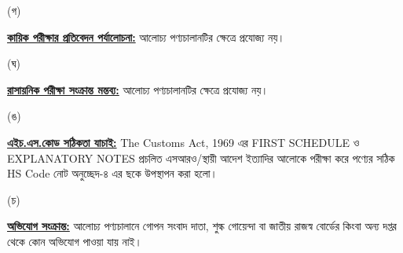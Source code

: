 \documentclass[12pt]{article}
\begin{document}
\begin{minipage}[t]{0.05\linewidth}
\hspace{1em}
\end{minipage}
\begin{minipage}[t]{0.05\linewidth}
(গ)
\end{minipage}
\begin{minipage}[t]{0.90\linewidth}
\underline{\textbf{কায়িক পরীক্ষার প্রতিবেদন পর্যালোচনা:}}
আলোচ্য পণ্যচালানটির ক্ষেত্রে প্রযোজ্য নয়।
\\
\end{minipage}
\begin{minipage}[t]{0.05\linewidth}
\hspace{1em}
\end{minipage}
\begin{minipage}[t]{0.05\linewidth}
(ঘ)
\end{minipage}
\begin{minipage}[t]{0.90\linewidth}
\underline{\textbf{রাসায়নিক পরীক্ষা সংক্রান্ত মন্তব্য:}}
আলোচ্য পণ্যচালানটির ক্ষেত্রে প্রযোজ্য নয়।
\\
\end{minipage}
\begin{minipage}[t]{0.05\linewidth}
\hspace{1em}
\end{minipage}
\begin{minipage}[t]{0.05\linewidth}
(ঙ)
\end{minipage}
\begin{minipage}[t]{0.90\linewidth}
\underline{\textbf{এইচ.এস.কোড সঠিকতা যাচাই:}}
The Customs Act, 1969 এর FIRST SCHEDULE ও
EXPLANATORY NOTES প্রচলিত এসআরও/স্থায়ী আদেশ ইত্যাদির আলোকে পরীক্ষা করে পণ্যের সঠিক HS Code নোট অনুচ্ছেদ-৪
এর ছকে উপস্থাপন করা হলো।
\\
\end{minipage}
\begin{minipage}[t]{0.05\linewidth}
\hspace{1em}
\end{minipage}
\begin{minipage}[t]{0.05\linewidth}
(চ)
\end{minipage}
\begin{minipage}[t]{0.90\linewidth}
\underline{\textbf{অভিযোগ সংক্রান্ত:}} আলোচ্য পণ্যচালানে
গোপন সংবাদ দাতা, শুল্ক গোয়েন্দা বা
জাতীয় রাজস্ব বোর্ডের কিংবা অন্য দপ্তর থেকে
কোন অভিযোগ পাওয়া যায় নাই।
\\
\end{minipage}
\begin{minipage}[t]{0.05\linewidth}
\hspace{1em}
\end{minipage}
\end{document}
